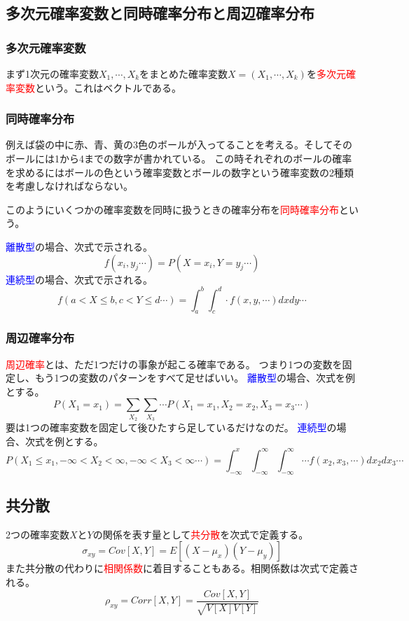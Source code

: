 \documentclass[a4paper,10pt]{jarticle}
\begin{document}
\subsection{多次元確率変数と同時確率分布と周辺確率分布}
\subsubsection{多次元確率変数}
まず1次元の確率変数$X_1,\cdots,X_k$をまとめた確率変数$X=(X_1,\cdots,X_k)$を\textcolor{red}{多次元確率変数}という。これはベクトルである。
\subsubsection{同時確率分布}
例えば袋の中に赤、青、黄の3色のボールが入ってることを考える。そしてそのボールには1から4までの数字が書かれている。
この時それぞれのボールの確率を求めるにはボールの色という確率変数とボールの数字という確率変数の2種類を考慮しなければならない。

このようにいくつかの確率変数を同時に扱うときの確率分布を\textcolor{red}{同時確率分布}という。

\textcolor{blue}{離散型}の場合、次式で示される。
\begin{equation}
    f(x_i,y_j\cdots)=P(X=x_i,Y=y_j\cdots)\tag{2,14}
\end{equation}
\textcolor{blue}{連続型}の場合、次式で示される。
\begin{equation}
    f(a<X\leq b,c<Y\leq d\cdots)=\int_a^b\int_c^d\cdot f(x,y,\cdots) dxdy\cdots\tag{2,15}
\end{equation}
\subsubsection{周辺確率分布}
\textcolor{red}{周辺確率}とは、ただ1つだけの事象が起こる確率である。
つまり1つの変数を固定し、もう1つの変数のパターンをすべて足せばいい。
\textcolor{blue}{離散型}の場合、次式を例とする。
\begin{equation}
    P(X_1=x_1)=\sum_{X_2}\sum_{X_3}\cdots P(X_1 = x_1,X_2 = x_2, X_3 = x_3\cdots)\tag{2,16}
\end{equation}
要は1つの確率変数を固定して後ひたすら足しているだけなのだ。
\textcolor{blue}{連続型}の場合、次式を例とする。
\begin{equation}
    P(X_1\leq x_1,-\infty < X_2 < \infty,-\infty < X_3 < \infty \cdots) = \int_{-\infty}^x\int_{-\infty}^\infty\int_{-\infty}^\infty\cdots f(x_2,x_3,\cdots)dx_2dx_3\cdots\tag{2,17}
\end{equation}
\subsection{共分散}
2つの確率変数$X$と$Y$の関係を表す量として\textcolor{red}{共分散}を次式で定義する。
\begin{equation}
    \sigma_{xy}=Cov[X,Y]=E[(X-\mu_x)(Y-\mu_y)] \tag{2,18}
\end{equation}
また共分散の代わりに\textcolor{red}{相関係数}に着目することもある。相関係数は次式で定義される。
\begin{equation}
    \rho_{xy} = Corr[X,Y] = \frac{Cov[X,Y]}{\sqrt{V[X]V[Y]}}\tag{2,19}
\end{equation}
\end{document}
